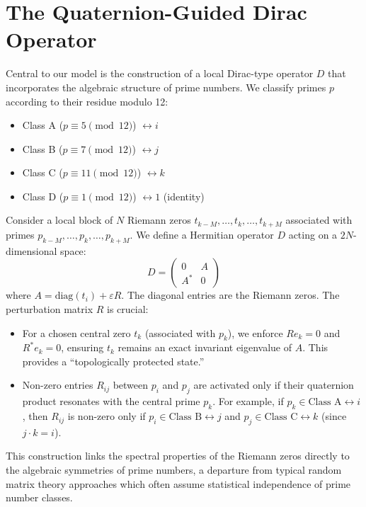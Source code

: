 \documentclass[11pt,a4paper]{article}
\newcommand{\eps}{\varepsilon}
\theoremstyle{definition}
\begin{document}
\section{The Quaternion-Guided Dirac Operator}
\label{sec:dirac_operator}
Central to our model is the construction of a local Dirac-type operator $D$ that incorporates the algebraic structure of prime numbers. We classify primes $p$ according to their residue modulo 12:
\begin{itemize}
    \item Class A ($p \equiv 5 \pmod{12}$) $\leftrightarrow i$
    \item Class B ($p \equiv 7 \pmod{12}$) $\leftrightarrow j$
    \item Class C ($p \equiv 11 \pmod{12}$) $\leftrightarrow k$
    \item Class D ($p \equiv 1 \pmod{12}$) $\leftrightarrow 1$ (identity)
\end{itemize}
Consider a local block of $N$ Riemann zeros $t_{k-M}, \dots, t_k, \dots, t_{k+M}$ associated with primes $p_{k-M}, \dots, p_k, \dots, p_{k+M}$. We define a Hermitian operator $D$ acting on a $2N$-dimensional space:
\begin{equation}
D = \begin{pmatrix} 0 & A \\ A^* & 0 \end{pmatrix}
\end{equation}
where $A = \text{diag}(t_i) + \eps R$. The diagonal entries are the Riemann zeros. The perturbation matrix $R$ is crucial:
\begin{itemize}
    \item For a chosen central zero $t_k$ (associated with $p_k$), we enforce $Re_k = 0$ and $R^*e_k = 0$, ensuring $t_k$ remains an exact invariant eigenvalue of $A$. This provides a ``topologically protected state.''
    \item Non-zero entries $R_{ij}$ between $p_i$ and $p_j$ are activated only if their quaternion product resonates with the central prime $p_k$. For example, if $p_k \in \text{Class A} \leftrightarrow i$, then $R_{ij}$ is non-zero only if $p_i \in \text{Class B} \leftrightarrow j$ and $p_j \in \text{Class C} \leftrightarrow k$ (since $j \cdot k = i$).
\end{itemize}
This construction links the spectral properties of the Riemann zeros directly to the algebraic symmetries of prime numbers, a departure from typical random matrix theory approaches which often assume statistical independence of prime number classes.
\end{document}
